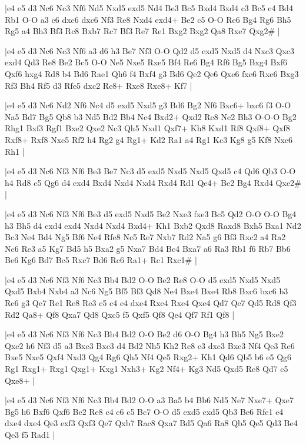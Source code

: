 \whitename{}
\blackname{}
\makegametitle
|e4 e5 d3 Nc6 Nc3 Nf6 Nd5 Nxd5 exd5 Nd4 Be3 Bc5 Bxd4 Bxd4 c3 Bc5 c4 Bd4 Rb1 O-O a3 c6 dxc6 dxc6 Nf3 Re8 Nxd4 exd4+ Be2 c5 O-O Re6 Bg4 Rg6 Bh5 Rg5 a4 Bh3 Bf3 Rc8 Bxb7 Rc7 Bf3 Re7 Re1 Bxg2 Bxg2 Qa8 Rxe7 Qxg2\#  |

\whitename{}
\blackname{}
\makegametitle
|e4 e5 d3 Nc6 Nc3 Nf6 a3 d6 h3 Be7 Nf3 O-O Qd2 d5 exd5 Nxd5 d4 Nxc3 Qxc3 exd4 Qd3 Re8 Be2 Bc5 O-O Ne5 Nxe5 Rxe5 Bf4 Re6 Bg4 Rf6 Bg5 Bxg4 Bxf6 Qxf6 hxg4 Rd8 b4 Bd6 Rae1 Qh6 f4 Bxf4 g3 Bd6 Qe2 Qe6 Qxe6 fxe6 Rxe6 Bxg3 Rf3 Bh4 Rf5 d3 Rfe5 dxc2 Re8+ Rxe8 Rxe8+ Kf7  |

\whitename{}
\blackname{}
\makegametitle
|e4 e5 d3 Nc6 Nd2 Nf6 Nc4 d5 exd5 Nxd5 g3 Bd6 Bg2 Nf6 Bxc6+ bxc6 f3 O-O Na5 Bd7 Bg5 Qb8 b3 Nd5 Bd2 Bb4 Nc4 Bxd2+ Qxd2 Re8 Ne2 Bh3 O-O-O Bg2 Rhg1 Bxf3 Rgf1 Bxe2 Qxe2 Nc3 Qh5 Nxd1 Qxf7+ Kh8 Kxd1 Rf8 Qxf8+ Qxf8 Rxf8+ Rxf8 Nxe5 Rf2 h4 Rg2 g4 Rg1+ Kd2 Ra1 a4 Rg1 Kc3 Kg8 g5 Kf8 Nxc6 Rh1  |

\whitename{}
\blackname{}
\makegametitle
|e4 e5 d3 Nc6 Nf3 Nf6 Be3 Be7 Nc3 d5 exd5 Nxd5 Nxd5 Qxd5 c4 Qd6 Qb3 O-O h4 Rd8 c5 Qg6 d4 exd4 Bxd4 Nxd4 Nxd4 Rxd4 Rd1 Qe4+ Be2 Bg4 Rxd4 Qxe2\#  |

\whitename{}
\blackname{}
\makegametitle
|e4 e5 d3 Nc6 Nf3 Nf6 Be3 d5 exd5 Nxd5 Be2 Nxe3 fxe3 Bc5 Qd2 O-O O-O Bg4 h3 Bh5 d4 exd4 exd4 Nxd4 Nxd4 Bxd4+ Kh1 Bxb2 Qxd8 Raxd8 Bxh5 Bxa1 Nd2 Bc3 Ne4 Bd4 Ng5 Bf6 Ne4 Rfe8 Nc5 Re7 Nxb7 Rd2 Na5 g6 Bf3 Rxc2 a4 Ra2 Nc6 Re3 a5 Kg7 Bd5 h5 Bxa2 g5 Nxa7 Bd4 Bc4 Bxa7 a6 Ra3 Rb1 f6 Rb7 Bb6 Be6 Kg6 Bd7 Bc5 Rxc7 Bd6 Rc6 Ra1+ Rc1 Rxc1\#  |

\whitename{}
\blackname{}
\makegametitle
|e4 e5 d3 Nc6 Nf3 Nf6 Nc3 Bb4 Bd2 O-O Be2 Re8 O-O d5 exd5 Nxd5 Nxd5 Qxd5 Bxb4 Nxb4 a3 Nc6 Ng5 Bf5 Bf3 Qd8 Ne4 Bxe4 Bxe4 Rb8 Bxc6 bxc6 b3 Re6 g3 Qe7 Re1 Re8 Re3 c5 c4 e4 dxe4 Rxe4 Rxe4 Qxe4 Qd7 Qe7 Qd5 Rd8 Qf3 Rd2 Qa8+ Qf8 Qxa7 Qd8 Qxc5 f5 Qxf5 Qf8 Qe4 Qf7 Rf1 Qf8  |

\whitename{}
\blackname{}
\makegametitle
|e4 e5 d3 Nc6 Nf3 Nf6 Nc3 Bb4 Bd2 O-O Be2 d6 O-O Bg4 h3 Bh5 Ng5 Bxe2 Qxe2 h6 Nf3 d5 a3 Bxc3 Bxc3 d4 Bd2 Nh5 Kh2 Re8 c3 dxc3 Bxc3 Nf4 Qe3 Re6 Bxe5 Nxe5 Qxf4 Nxd3 Qg4 Rg6 Qh5 Nf4 Qe5 Rxg2+ Kh1 Qd6 Qb5 b6 e5 Qg6 Rg1 Rxg1+ Rxg1 Qxg1+ Kxg1 Nxh3+ Kg2 Nf4+ Kg3 Nd5 Qxd5 Re8 Qd7 c5 Qxe8+  |

\whitename{}
\blackname{}
\makegametitle
|e4 e5 d3 Nc6 Nf3 Nf6 Nc3 Bb4 Bd2 O-O a3 Ba5 b4 Bb6 Nd5 Ne7 Nxe7+ Qxe7 Bg5 h6 Bxf6 Qxf6 Be2 Re8 c4 c6 c5 Bc7 O-O d5 exd5 cxd5 Qb3 Be6 Rfe1 e4 dxe4 dxe4 Qe3 exf3 Qxf3 Qe7 Qxb7 Rac8 Qxa7 Bd5 Qa6 Ra8 Qb5 Qe5 Qd3 Be4 Qe3 f5 Rad1  |

